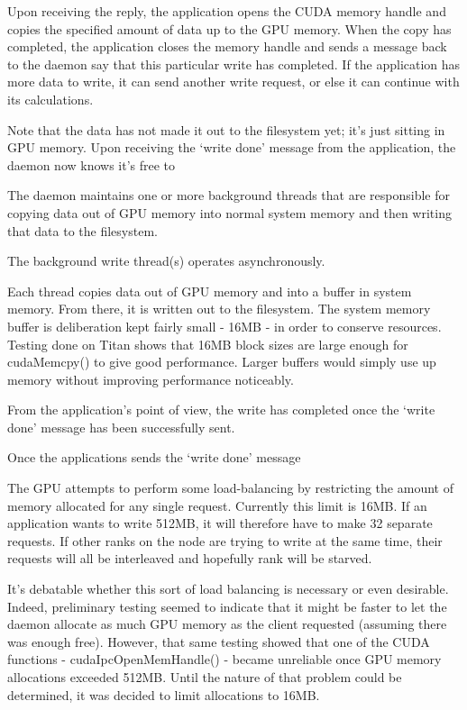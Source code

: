 Upon receiving the reply, the application opens the CUDA memory handle and copies the specified amount of data up to the GPU memory.  When the copy has completed, the application closes the memory handle and sends a message back to the daemon say that this particular write has completed.  If the application has more data to write, it can send another write request, or else it can continue with its calculations.

Note that the data has not made it out to the filesystem yet; it's just sitting in GPU memory.  Upon receiving the `write done' message from the application, the daemon now knows it's free to 

The daemon maintains one or more background threads that are responsible for copying data out of GPU memory into normal system memory and then writing that data to the filesystem. 

The background write thread(s) operates asynchronously.

Each thread copies data out of GPU memory and into a buffer in system memory.  From there, it is written out to the filesystem.  The system memory buffer is deliberation kept fairly small - 16MB - in order to conserve resources.  Testing done on Titan shows that 16MB block sizes are large enough for cudaMemcpy() to give good performance.\cite{ac_guide}  Larger buffers would simply use up memory without improving performance noticeably. 




From the application's point of view, the write has completed once the `write done' message has been successfully sent.


Once the applications sends the `write done' message


The GPU attempts to perform some load-balancing by restricting the amount of memory allocated for any single request.  Currently this limit is 16MB.  If an application wants to write 512MB, it will therefore have to make 32 separate requests.  If other ranks on the node are trying to write at the same time, their requests will all be interleaved and hopefully rank will be starved.

It's debatable whether this sort of load balancing is necessary or even desirable.  Indeed, preliminary testing seemed to indicate that it might be faster to let the daemon allocate  as much GPU memory as the client requested (assuming there was enough free).  However, that same testing showed that one of the CUDA functions - cudaIpcOpenMemHandle() - became unreliable once GPU memory allocations exceeded 512MB.  Until the nature of that problem could be determined, it was decided to limit allocations to 16MB.


